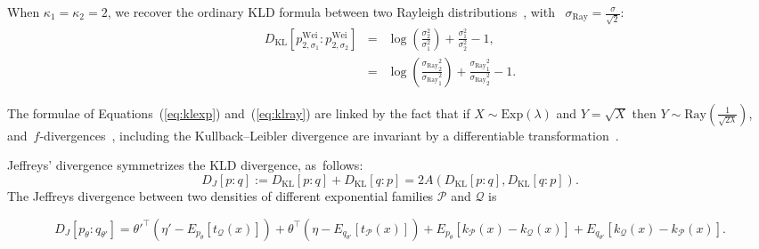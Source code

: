 \documentclass[entropy,article,accept,oneauthor,pdftex,entropy]{Definitions/mdpi}
\def\Ray{\mathrm{Ray}}
\def\calQ{\mathcal{Q}}
\def\Wei{\mathrm{Wei}}
\def\KL{\mathrm{KL}}
\def\calQ{\mathcal{Q}}
\def\calP{\mathcal{P}}
\begin{document}
\begin{paracol}{2}
\begin{Example}
When $\kappa_1=\kappa_2=2$, we recover the ordinary KLD formula between two Rayleigh distributions~\cite{EF-2009}, with~
$\sigma_\Ray=\frac{\sigma}{\sqrt{2}}$:
\begin{eqnarray}
D_\KL\left[p^\Wei_{2,\sigma_1}:p^\Wei_{2,\sigma_2}\right] &=&  \log\left(\frac{\sigma_2^2}{\sigma_1^2}\right)+ \frac{\sigma_1^2}{\sigma_2^2}-1,\\
&=& \log\left(\frac{{\sigma_\Ray}_2^2}{{\sigma_\Ray}_1^2}\right)+ \frac{{\sigma_\Ray}_1^2}{{\sigma_\Ray}_2^2}-1.\label{eq:klray}
\end{eqnarray}

The formulae of Equations~(\ref{eq:klexp}) and~(\ref{eq:klray}) are linked by the fact that if $X\sim\mathrm{Exp}(\lambda)$ and $Y=\sqrt{X}$ then $Y\sim \mathrm{Ray}\left(\frac{1}{\sqrt{2\lambda}}\right)$, and~$f$-divergences~\cite{Csiszar-1967}, including the Kullback--Leibler divergence are invariant by a differentiable transformation~\cite{infoproj-2021}.
\end{Example}



Jeffreys' divergence symmetrizes the KLD divergence, as~follows:
\begin{equation}
D_J[p:q] := D_\KL[p:q]+D_\KL[q:p]=2A(D_\KL[p:q],D_\KL[q:p]).
\end{equation}
The Jeffreys divergence between two densities of different exponential families $\calP$ and $\calQ$ is
\end{paracol}
\nointerlineskip
\begin{equation}
D_J[p_\theta:q_{\theta'}]=\theta'^\top(\eta'-E_{p_\theta}[t_\calQ(x)])+\theta^\top(\eta-E_{q_{\theta'}}[t_\calP(x)])
+E_{p_\theta}[k_\calP(x)-k_\calQ(x)]+E_{q_{\theta'}}[k_\calQ(x)-k_\calP(x)].
\end{equation}
\end{document}
